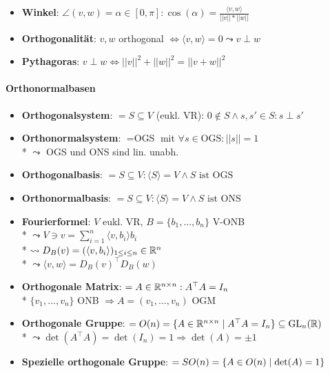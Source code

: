 \begin{itemize}
	\item \textbf{Winkel}: \( \angle(v,w) = \alpha \in [0,\pi]: \cos(\alpha) = \tfrac{\langle v,w \rangle}{||v||*||w||} \)
	\item \textbf{Orthogonalität}: \( v,w \) orthogonal \( \Leftrightarrow \langle v,w \rangle = 0 \leadsto v \perp w \)
	\item \textbf{Pythagoras}: \( v \perp w \Leftrightarrow ||v||^2 + ||w||^2 = ||v+w||^2 \)
\end{itemize}

\paragraph{Orthonormalbasen}
\begin{itemize}
	\item \textbf{Orthogonalsystem}: \( = S \subseteq V \) (eukl. VR): \( 0 \not \in S \wedge s, s' \in S: s \perp s' \)
	\item \textbf{Orthonormalsystem}: \( = \text{OGS} \) mit \( \forall s \in \text{OGS}: ||s|| = 1 \)
		\\*
		\( \leadsto \) OGS und ONS sind lin. unabh.
	\item \textbf{Orthogonalbasis}: \( = S \subseteq V: \langle S \rangle = V \wedge S \text{ ist OGS} \)
	\item \textbf{Orthonormalbasis}: \( = S \subseteq V: \langle S \rangle = V \wedge S \text{ ist ONS} \)
	\item \textbf{Fourierformel}: \( V \) eukl. VR, \( B = \{ b_1, \dots, b_n \} \) V-ONB
		\\*
		\( \leadsto V \ni v = \sum_{i=1}^n \langle v,b_i \rangle b_i \)
		\\*
		\( \leadsto D_B(v) = (\langle v, b_i \rangle)_{1 \leq i \leq n} \in \mathbb{R}^n \)
		\\*
		\( \leadsto \langle v,w \rangle = D_B(v)^\top D_B(w) \)
	\item \textbf{Orthogonale Matrix}: \( = A \in \mathbb{R}^{n \times n}: A^\top A = I_n \)
		\\*
		\( \{ v_1, \dots, v_n \} \) ONB \( \Rightarrow A = (v_1, \dots, v_n) \) OGM
	\item \textbf{Orthogonale Gruppe}: \( = O(n) \\* = \{ A \in \mathbb{R}^{n \times n} \mid A^\top A = I_n \} \subseteq \text{GL}_n(\mathbb{R}) \)
		\\* \( \leadsto \det(A^\top A) = \det(I_n) = 1 \Rightarrow \det(A) = \pm 1 \)
	\item \textbf{Spezielle orthogonale Gruppe}: \( = SO(n) \\* =\{ A \in O(n) \mid \det(A) = 1 \} \)


\end{itemize}
